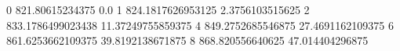0 821.80615234375 0.0
1 824.1817626953125 2.3756103515625
2 833.1786499023438 11.37249755859375
4 849.2752685546875 27.4691162109375
6 861.6253662109375 39.8192138671875
8 868.820556640625 47.014404296875
